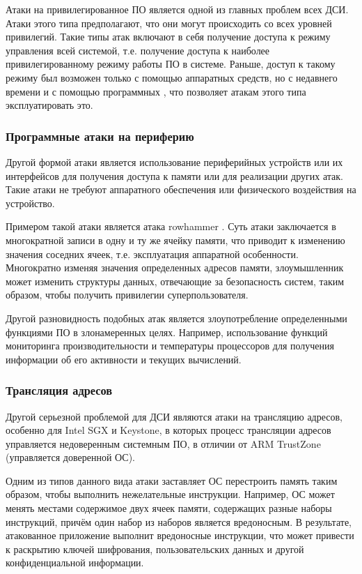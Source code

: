 Атаки на привилегированное ПО является одной из главных проблем всех ДСИ. Атаки этого типа предполагают, что они могут происходить со всех уровней привилегий. Такие типы атак включают в себя получение доступа к режиму управления всей системой, т.е. получение доступа к наиболее привилегированному режиму работы ПО в системе. Раньше, доступ к такому режиму был возможен только с помощью аппаратных средств, но с недавнего времени и с помощью программных \cite{comparsion-arm-intel}, что позволяет атакам этого типа эксплуатировать это.

\subsubsection{Программные атаки на периферию}

Другой формой атаки является использование периферийных устройств или их интерфейсов для получения доступа к памяти или для реализации других атак. Такие атаки не требуют аппаратного обеспечения или физического воздействия на устройство. 

Примером такой атаки является атака rowhammer \cite{rowhammer}. Суть атаки заключается в многократной записи в одну и ту же ячейку памяти, что приводит к изменению значения соседних ячеек, т.е. эксплуатация аппаратной особенности. Многократно изменяя значения определенных адресов памяти, злоумышленник может изменить структуры данных, отвечающие за безопасность систем, таким образом, чтобы получить привилегии суперпользователя.

Другой разновидность подобных атак является злоупотребление определенными функциями ПО в злонамеренных целях. Например, использование функций мониторинга производительности и температуры процессоров для получения информации об его активности и текущих вычислений.

\subsubsection{Трансляция адресов}

Другой серьезной проблемой для ДСИ являются атаки на трансляцию адресов, особенно для Intel SGX и Keystone, в которых процесс трансляции адресов управляется недоверенным системным ПО, в отличии от ARM TrustZone (управляется доверенной ОС).

Одним из типов данного вида атаки заставляет ОС перестроить память таким образом, чтобы выполнить нежелательные инструкции. Например, ОС может менять местами содержимое двух ячеек памяти, содержащих разные наборы инструкций, причём один набор из наборов является вредоносным. В результате, атакованное приложение выполнит вредоносные инструкции, что может привести к раскрытию ключей шифрования, пользовательских данных и другой конфиденциальной информации.

